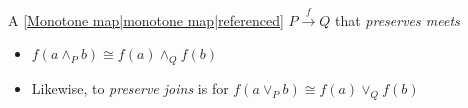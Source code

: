 
A \ref{Monotone map|monotone map|referenced} $P \xrightarrow{f} Q$ that \emph{preserves meets}

\begin{itemize}
    \item  $f(a \land_P b) \cong f(a) \land_Q f(b)$
    \item Likewise, to \emph{preserve joins} is for $f(a \lor_P b) \cong f(a) \lor_Q f(b)$
  \end{itemize}